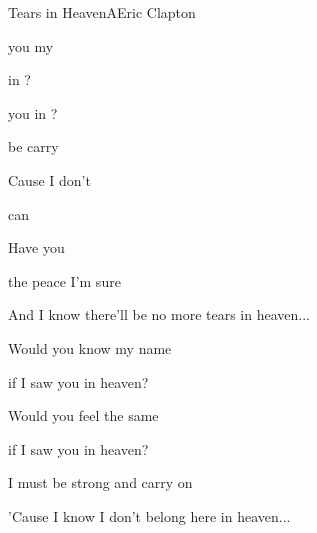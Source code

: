 \begin{song}{Tears in Heaven}{A}{Eric Clapton}

\begin{SBVerse}

 you  my 

  in ?

  

  you in ?

 be  carry 

Cause  I don't   


\end{SBVerse}

\begin{SBChorus}

   can  

   Have you    

\end{SBChorus}

\begin{SBChorus*}

 the  peace I'm sure

And I know there'll be no more tears in heaven...

\end{SBChorus*}

\begin{SBVerse}

Would you know my name

if I saw you in heaven?

Would you feel the same

if I saw you in heaven?

I must be strong and carry on

'Cause I know I don't belong here in heaven...

\end{SBVerse}

\end{song}

\clearpage
